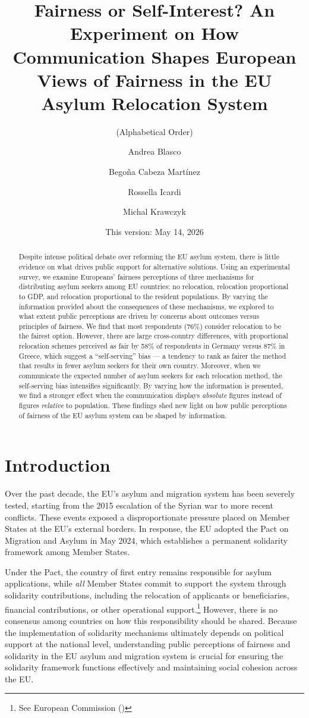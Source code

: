 \documentclass[
  12pt,
  a4paper,
]{article}
\title{Fairness or Self-Interest? An Experiment on How Communication Shapes European Views of Fairness in the EU Asylum Relocation System}
\author{(Alphabetical Order) \and Andrea Blasco \and Begoña Cabeza Martínez \and Rossella Icardi \and Michal Krawczyk}
\date{This version: May 14, 2026}
\begin{document}
\maketitle
\begin{abstract}
Despite intense political debate over reforming the EU asylum system, there is little evidence on what drives public support for alternative solutions. Using an experimental survey, we examine Europeans' fairness perceptions of three mechanisms for distributing asylum seekers among EU countries: no relocation, relocation proportional to GDP, and relocation proportional to the resident populations. By varying the information provided about the consequences of these mechanisms, we explored to what extent public perceptions are driven by concerns about outcomes versus principles of fairness. We find that most respondents (76\%) consider relocation to be the fairest option. However, there are large cross-country differences, with proportional relocation schemes perceived as fair by 58\% of respondents in Germany versus 87\% in Greece, which suggest a ``self-serving'' bias --- a tendency to rank as fairer the method that results in fewer asylum seekers for their own country. Moreover, when we communicate the expected number of asylum seekers for each relocation method, the self-serving bias intensifies significantly. By varying how the information is presented, we find a stronger effect when the communication displays \emph{absolute} figures instead of figures \emph{relative} to population. These findings shed new light on how public perceptions of fairness of the EU asylum system can be shaped by information.
\end{abstract}

\clearpage

\section{Introduction}\label{introduction}

Over the past decade, the EU's asylum and migration system has been severely tested, starting from the 2015 escalation of the Syrian war to more recent conflicts. These events exposed a disproportionate pressure placed on Member States at the EU's external borders. In response, the EU adopted the Pact on Migration and Asylum in May 2024, which establishes a permanent solidarity framework among Member States.

Under the Pact, the country of first entry remains responsible for asylum applications, while \emph{all} Member States commit to support the system through solidarity contributions, including the relocation of applicants or beneficiaries, financial contributions, or other operational support.\footnote{See European Commission ()} However, there is no consensus among countries on how this responsibility should be shared. Because the implementation of solidarity mechanisms ultimately depends on political support at the national level, understanding public perceptions of fairness and solidarity in the EU asylum and migration system is crucial for ensuring the solidarity framework functions effectively and maintaining social cohesion across the EU.
\end{document}
